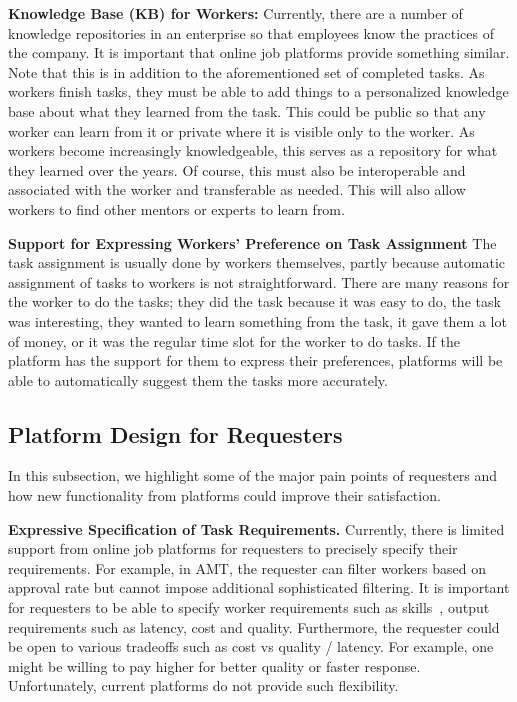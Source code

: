 \textbf{Knowledge Base (KB) for Workers:}
Currently, there are a number of knowledge repositories in an
enterprise so that employees know the practices of the company.
It is important that online job platforms provide something similar.
Note that this is in addition to the aforementioned set of completed tasks.
As workers finish tasks, they must be able to add things to a personalized knowledge base
about what they learned from the task.
This could be public so that any worker can learn from it or
private where it is visible only to the worker.
As workers become increasingly knowledgeable, this serves as a repository for what they learned over the years.
Of course, this must also be interoperable and associated with the worker and transferable as needed.
This will also allow workers to find other mentors or experts to learn from.


\textbf{Support for Expressing Workers' Preference on Task Assignment}
The task assignment is usually done by workers themselves, partly because automatic assignment of  tasks to workers is not straightforward. There are many reasons for the worker to do the tasks; they did the task because it was easy to do, the task was interesting, they wanted to learn something from the task,  it gave them a lot of money, or it was the regular time slot for the worker to do tasks. If the platform has  the support for them to express their preferences, platforms will be able to automatically suggest them the tasks more accurately.






\subsection{Platform Design for Requesters}
In this subsection, we highlight some of the major pain points of requesters
and how new functionality from platforms could improve their satisfaction.

\textbf{Expressive Specification of Task Requirements.}
Currently, there is limited support from online job platforms for requesters
to precisely specify their requirements.
For example, in AMT, the requester can filter workers based on approval rate but cannot impose additional sophisticated filtering.
It is important for requesters to be able to specify worker requirements such as skills~\cite{DBLP:conf/www/MavridisGM16},
output requirements such as latency, cost and quality.
Furthermore, the requester could be open to various tradeoffs such as cost vs quality / latency.
For example, one might be willing to pay higher for better quality or faster response.
Unfortunately, current platforms do not provide such flexibility.

